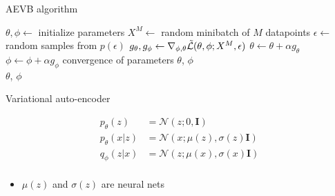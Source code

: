 \documentclass[unicode,11pt]{beamer}
\begin{document}
\begin{frame}{AEVB algorithm}
  \centering
  \begin{algorithmic}
    \State $\theta, \phi \gets$ initialize parameters
    \Repeat
       \State $X^M \gets$ random minibatch of $M$ datapoints
       \State $\epsilon \gets$ random samples from $p(\epsilon)$
       \State $g_\theta, g_\phi \gets \nabla_{\phi, \theta} \mathcal{\tilde{L}}(\theta, \phi; X^M, \epsilon)$
       \State $\theta \gets \theta + \alpha g_\theta$
       \State $\phi \gets \phi + \alpha g_\phi$
    \Until convergence of parameters $\theta$, $\phi$ \\
    \Return $\theta$, $\phi$
  \end{algorithmic}
\end{frame}


\begin{frame}{Variational auto-encoder}
  \begin{center}
    \begin{minipage}[t]{.3\linewidth}
    \end{minipage}
    \begin{minipage}[t]{.55\linewidth}
      \begin{align*}
        p_\theta(z) &= \mathcal{N}(z; 0, \mathbf{I}) \\
        p_\theta(x|z) &= \mathcal{N}(x; \mu(z), \sigma(z) \mathbf{I}) \\
        q_\phi(z|x) &= \mathcal{N}(z; \mu(x), \sigma(x) \mathbf{I}) \\
      \end{align*}
    \end{minipage}
  \end{center}

  \begin{itemize}
  \item $\mu(z)$ and $\sigma(z)$ are neural nets
  \end{itemize}
\end{frame}
\end{document}
